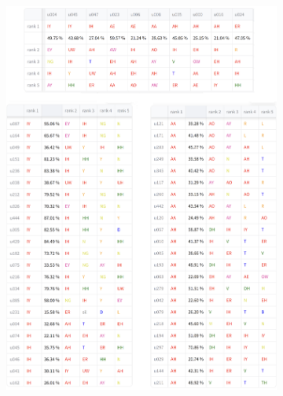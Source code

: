 {\begin{figure}
                         \label{fig:hub-u050-phnobserver--2}
        \end{figure}
    }

        {
        \newcommand{\tempwidth}[0]{0.8\linewidth}
        \begin{figure}
        \ContinuedFloat
        
             \centering
             \begin{subfigure}{\textwidth}
                 \centering
                 \includegraphics[width=\tempwidth]{figures/ch4figs/vow_phn.png}

\end{subfigure}
\end{figure}}
